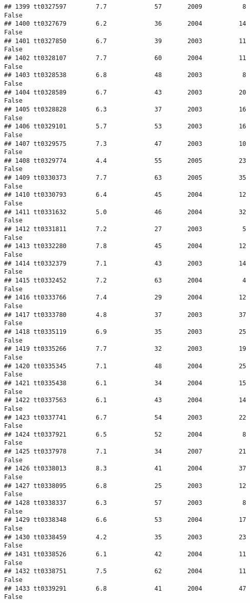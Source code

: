 \documentclass[
]{article}
\begin{document}
\begin{verbatim}
## 1399 tt0327597        7.7             57       2009           8   False
## 1400 tt0327679        6.2             36       2004          14   False
## 1401 tt0327850        6.7             39       2003          11   False
## 1402 tt0328107        7.7             60       2004          11   False
## 1403 tt0328538        6.8             48       2003           8   False
## 1404 tt0328589        6.7             43       2003          20   False
## 1405 tt0328828        6.3             37       2003          16   False
## 1406 tt0329101        5.7             53       2003          16   False
## 1407 tt0329575        7.3             47       2003          10   False
## 1408 tt0329774        4.4             55       2005          23   False
## 1409 tt0330373        7.7             63       2005          35   False
## 1410 tt0330793        6.4             45       2004          12   False
## 1411 tt0331632        5.0             46       2004          32   False
## 1412 tt0331811        7.2             27       2003           5   False
## 1413 tt0332280        7.8             45       2004          12   False
## 1414 tt0332379        7.1             43       2003          14   False
## 1415 tt0332452        7.2             63       2004           4   False
## 1416 tt0333766        7.4             29       2004          12   False
## 1417 tt0333780        4.8             37       2003          37   False
## 1418 tt0335119        6.9             35       2003          25   False
## 1419 tt0335266        7.7             32       2003          19   False
## 1420 tt0335345        7.1             48       2004          25   False
## 1421 tt0335438        6.1             34       2004          15   False
## 1422 tt0337563        6.1             43       2004          14   False
## 1423 tt0337741        6.7             54       2003          22   False
## 1424 tt0337921        6.5             52       2004           8   False
## 1425 tt0337978        7.1             34       2007          21   False
## 1426 tt0338013        8.3             41       2004          37   False
## 1427 tt0338095        6.8             25       2003          12   False
## 1428 tt0338337        6.3             57       2003           8   False
## 1429 tt0338348        6.6             53       2004          17   False
## 1430 tt0338459        4.2             35       2003          23   False
## 1431 tt0338526        6.1             42       2004          11   False
## 1432 tt0338751        7.5             62       2004          11   False
## 1433 tt0339291        6.8             41       2004          47   False

\end{verbatim}
\end{document}
